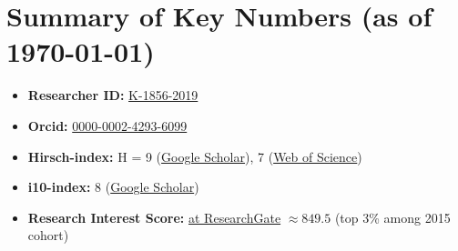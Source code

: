 \documentclass[10pt,a4paper,colorlinks,linkcolor=blue,urlcolor=blue,citecolor=blue]{moderncv}
\begin{document}
\section{Summary of Key Numbers (as of \today)}
\begin{itemize}[leftmargin=1.25em]
\item \textbf{Researcher ID:} \href{https://www.webofscience.com/wos/author/record/K-1856-2019}{K-1856-2019}
\item \textbf{Orcid:} \href{https://orcid.org/0000-0002-4293-6099}{0000-0002-4293-6099}
\item \textbf{Hirsch-index:} H = 9 (\href{https://scholar.google.com/citations?hl=en&user=tHb_qZoAAAAJ}{Google Scholar}), 7 (\href{https://www.webofscience.com/wos/author/record/K-1856-2019}{Web of Science})
\item \textbf{i10-index:} 8 (\href{https://scholar.google.com/citations?hl=en&user=tHb_qZoAAAAJ}{Google Scholar})
\item \textbf{Research Interest Score:} \href{https://www.researchgate.net/profile/Vatsal-Sanjay-2}{at ResearchGate} $\approx 849.5$ (top 3\% among 2015 cohort)
\end{itemize}

\end{document}
